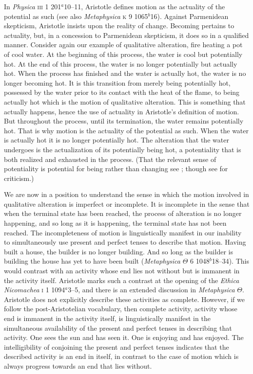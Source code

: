 In \emph{Physica} \textsc{iii} 1 201\( ^{a} \)10--11, Aristotle defines motion as the actuality of the potential as such (see also \emph{Metaphysica} \textsc{k} 9 1065\( ^{b} \)16). Against Parmenidean skepticism, Aristotle insists upon the reality of change. Becoming pertains to actuality, but, in a concession to Parmenidean skepticism, it does so in a qualified manner. Consider again our example of qualitative alteration, fire heating a pot of cool water. At the beginning of this process, the water is cool but potentially hot. At the end of this process, the water is no longer potentially but actually hot. When the process has finished and the water is actually hot, the water is no longer becoming hot. It is this transition from merely being potentially hot, possessed by the water prior to its contact with the heat of the flame, to being actually hot which is the motion of qualitative alteration. This is something that actually happens, hence the use of actuality in Aristotle's definition of motion. But throughout the process, until its termination, the water remains potentially hot. That is why motion is the actuality of the potential as such. When the water is actually hot it is no longer potentially hot. The alteration that the water undergoes is the actualization of its potentially being hot, a potentiality that is both realized and exhausted in the process. (That the relevant sense of potentiality is potential for being rather than changing see \citealt{Kosman:1969aa}; though see \citealt{Heinaman:1994aa} for criticism.)

We are now in a position to understand the sense in which the motion involved in qualitative alteration is imperfect or incomplete. It is incomplete in the sense that when the terminal state has been reached, the process of alteration is no longer happening, and so long as it is happening, the terminal state has not been reached. The incompleteness of motion is linguistically manifest in our inability to simultaneously use present and perfect tenses to describe that motion. Having built a house, the builder is no longer building. And so long as the builder is building the house has yet to have been built (\emph{Metaphysica} \( \Theta \) 6 1048\( ^{b} \)18--34). This would contrast with an activity whose end lies not without but is immanent in the activity itself. Aristotle marks such a contrast at the opening of the \emph{Ethica Nicomachea} \textsc{i} 1 1094\( ^{a} \)3--5, and there is an extended discussion in \emph{Metaphysica} \( \Theta \). Aristotle does not explicitly describe these activities as complete. However, if we follow the post-Aristotelian vocabulary, then complete activity, activity whose end is immanent in the activity itself, is linguistically manifest in the simultaneous availability of the present and perfect tenses in describing that activity. One sees the sun and has seen it. One is enjoying and has enjoyed. The intelligibility of conjoining the present and perfect tenses indicates that the described activity is an end in itself, in contrast to the case of motion which is always progress towards an end that lies without.

